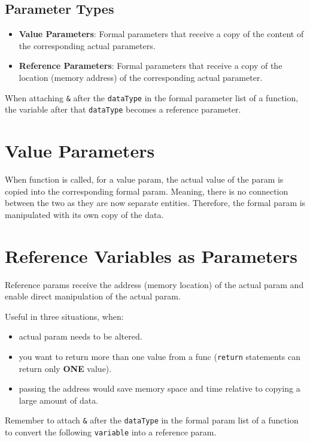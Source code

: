 \documentclass{article}
\begin{document}
\subsection{Parameter Types}
\begin{itemize}
  \item \textbf{Value Parameters}: Formal parameters that receive a copy of the
    content of the corresponding actual parameters.
  \item \textbf{Reference Parameters}: Formal parameters that receive a copy of
    the location (memory address) of the corresponding actual parameter.
\end{itemize}

When attaching \texttt{\&} after the \texttt{dataType} in the formal parameter list
of a function, the variable after that \texttt{dataType} becomes a reference
parameter.

\section{Value Parameters}
When function is called, for a value param, the actual value of the param is
copied into the corresponding formal param. Meaning, there is no connection
between the two as they are now separate entities. Therefore, the formal param
is manipulated with its own copy of the data.

\section{Reference Variables as Parameters}
Reference params receive the address (memory location) of the actual
param and enable direct manipulation of the actual param.

Useful in three situations, when:
\begin{itemize}
  \item actual param needs to be altered.
  \item you want to return more than one value from a func
    (\texttt{return} statements can return only \textbf{ONE} value).
  \item passing the address would save memory space and time relative to
    copying a large amount of data.
\end{itemize}

Remember to attach \texttt{\&} after the \texttt{dataType} in the formal param
list of a function to convert the following \texttt{variable} into a reference
param.
\end{document}
